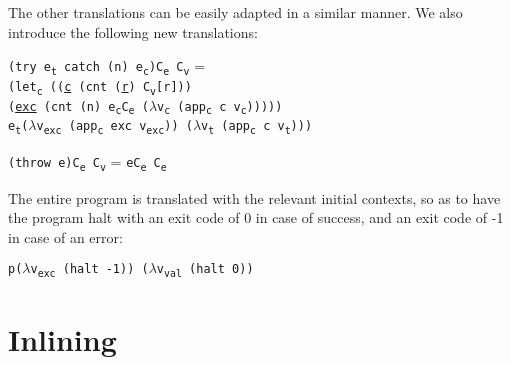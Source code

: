 \documentclass[12pt,a4paper]{article}
\newcommand{\cl}[3]{\texttt{\textcolor{OliveGreen}{#1}#2\textcolor{OliveGreen}{#3}}}
\newcommand{\cps}[3]{\texttt{\textcolor{BurntOrange}{#1}#2\textcolor{BurntOrange}{#3}}}
\newcommand{\ts}[2]{#1\textsubscript{#2}}
\newcommand{\code}[1]{\texttt{#1}}
\newcommand{\tran}[3]{\code{\textlbrackdbl #1\textrbrackdbl #2 #3}}
\newcommand{\cv}{\ts{C}{v}}
\newcommand{\ce}{\ts{C}{e}}
\newcommand{\letc}{\ts{let}{c}}
\newcommand{\appc}{\ts{app}{c}}
\begin{document}
The other translations can be easily adapted in a similar manner. We also introduce the following new translations:
\begin{description}
\item \tran{\cl{(try }{\ts{e}{t}}{} \cl{catch (}{n}{)} \cl{}{\ts{e}{c}}{)}}{\ce}{\cv} = \\
\cps{(\letc~}{\cps{(}{(\underline{c} \cps{(cnt }{(\underline{r}) \cv[r]}{)}) \\\hspace*{3.4em}(\underline{exc} \cps{(cnt }{(n) \tran{\ts{e}{c}}{\ce}{($\lambda$\ts{v}{c} \cps{(\appc~}{c \ts{v}{c}}{)})}}{)})}{)} \\\hspace*{1em}\tran{\ts{e}{t}}{($\lambda$\ts{v}{exc} \cps{(\appc~}{exc \ts{v}{exc}}{)})}{($\lambda$\ts{v}{t} \cps{(\appc~}{c \ts{v}{t}}{)})}}{)}
\item \tran{\cl{(throw }{e}{)}}{\ce}{\cv} = \tran{e}{\ce}{\ce}
\end{description}

The entire program is translated with the relevant initial contexts, so as to have the program halt with an exit code of 0 in case of success, and an exit code of -1 in case of an error:

\begin{center}
\tran{p}{($\lambda$\ts{v}{exc} \cps{(halt }{-1}{)})}{($\lambda$\ts{v}{val} \cps{(halt }{0}{)})}
\end{center}

\section{Inlining}
\end{document}
